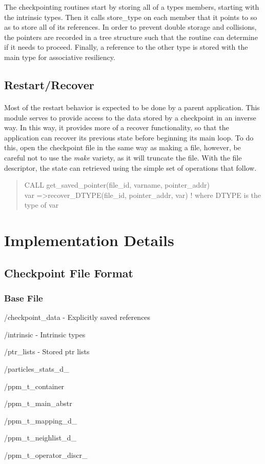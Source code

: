 \documentclass{article}
\begin{document}
The checkpointing routines start by storing all of a types members, starting with the intrinsic types. Then it calls store\_type on each member that it points to so as to store all of its references. In order to prevent double storage and collisions, the pointers are recorded in a tree structure such that the routine can determine if it needs to proceed. Finally, a reference to the other type is stored with the main type for associative resiliency.

\subsection{Restart/Recover}
\paragraph{}
Most of the restart behavior is expected to be done by a parent application. This module serves to provide access to the data stored by a checkpoint in an inverse way. In this way, it provides more of a recover functionality, so that the application can recover its previous state before beginning its main loop. To do this, open the checkpoint file in the same way as making a file, however, be careful not to use the \emph{make} variety, as it will truncate the file. With the file descriptor, the state can retrieved using the simple set of operations that follow.
\begin{quote}
   CALL get\_saved\_pointer(file\_id, varname, pointer\_addr) \\
   var =\textgreater recover\_DTYPE(file\_id, pointer\_addr, var) ! where DTYPE is the type of var
\end{quote}
\section{Implementation Details}
\subsection{Checkpoint File Format}
\subsubsection{Base File}
\label{sec:basefile}
\begin{list}{}{}
\item /checkpoint\_data - Explicitly saved references
\item /intrinsic - Intrinsic types
\item /ptr\_lists - Stored ptr lists
\item /particles\_stats\_d\_
\item /ppm\_t\_container
\item /ppm\_t\_main\_abstr
\item /ppm\_t\_mapping\_d\_
\item /ppm\_t\_neighlist\_d\_
\item /ppm\_t\_operator\_discr\_
\end{list}
\end{document}
